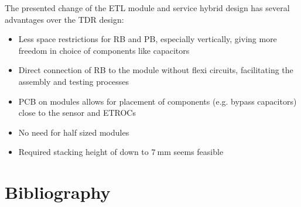 \documentclass[11pt]{article}
\begin{document}
The presented change of the ETL module and service hybrid design has several advantages over the TDR design:
\begin{itemize}
  \item Less space restrictions for RB and PB, especially vertically, giving more freedom in choice of components like capacitors
  \item Direct connection of RB to the module without flexi circuits, facilitating the assembly and testing processes
  \item PCB on modules allows for placement of components (e.g. bypass capacitors) close to the sensor and ETROCs
  \item No need for half sized modules
  \item Required stacking height of down to $7~\mathrm{mm}$ seems feasible
\end{itemize}

\clearpage

\section{Bibliography}
\end{document}
